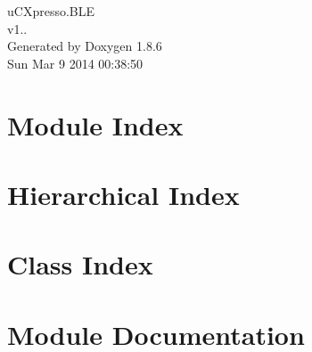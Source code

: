 \documentclass[twoside]{book}
\newcommand{\clearemptydoublepage}{%
  \newpage{\pagestyle{empty}\cleardoublepage}%
}
\begin{document}
\hypersetup{pageanchor=false}
\begin{titlepage}
\vspace*{7cm}
\begin{center}%
{\Large u\-C\-Xpresso.\-B\-L\-E \\[1ex]\large v1.. }\\
\vspace*{1cm}
{\large Generated by Doxygen 1.8.6}\\
\vspace*{0.5cm}
{\small Sun Mar 9 2014 00:38:50}\\
\end{center}
\end{titlepage}
\clearemptydoublepage
\tableofcontents
\clearemptydoublepage
{}
\hypersetup{pageanchor=true}

\chapter{Module Index}

\chapter{Hierarchical Index}

\chapter{Class Index}

\chapter{Module Documentation}


\end{document}
